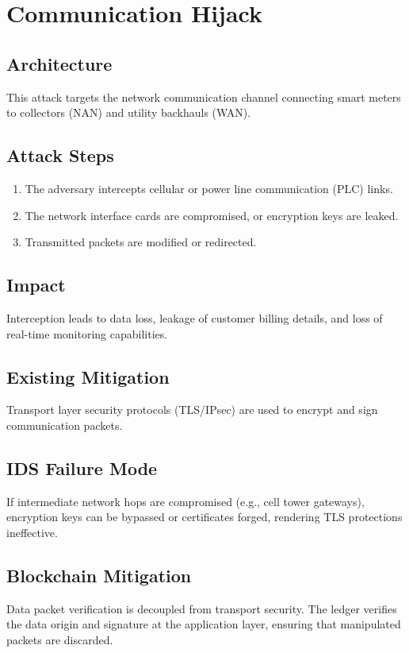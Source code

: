 \documentclass[12pt, oneside, a4paper]{report}
\theoremstyle{definition}
\theoremstyle{remark}
\begin{document}
\section{Communication Hijack}
\label{sec:tm:comm_hijack}

\subsection{Architecture}
This attack targets the network communication channel connecting smart meters to collectors (NAN) and utility backhauls (WAN).

\subsection{Attack Steps}
\begin{enumerate}
  \item The adversary intercepts cellular or power line communication (PLC) links.
  \item The network interface cards are compromised, or encryption keys are leaked.
  \item Transmitted packets are modified or redirected.
\end{enumerate}

\subsection{Impact}
Interception leads to data loss, leakage of customer billing details, and loss of real-time monitoring capabilities.

\subsection{Existing Mitigation}
Transport layer security protocols (TLS/IPsec) are used to encrypt and sign communication packets.

\subsection{IDS Failure Mode}
If intermediate network hops are compromised (e.g., cell tower gateways), encryption keys can be bypassed or certificates forged, rendering TLS protections ineffective.

\subsection{Blockchain Mitigation}
Data packet verification is decoupled from transport security. The ledger verifies the data origin and signature at the application layer, ensuring that manipulated packets are discarded.
\end{document}
